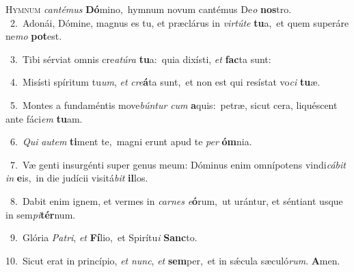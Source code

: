\lettrine{\initial\textcolor{\initialcolor}{H}}{ymnum} \textit{can}\-\textit{té}\textit{mus} \textbf{Dó}\-mino,~\star hymnum novum cantémus De\textit{o} \textbf{nos}\-tro.\\
{\numbfont\textcolor{\numbcolor}{~2.}}~Adonái, Dómine, magnus es tu, et præclárus in \textit{vir}\-\textit{tú}\textit{te} \textbf{tu}\-a,~\star et quem superáre ne\textit{mo} \textbf{pot}\-est.\par
{\numbfont\textcolor{\numbcolor}{~3.}}~Tibi sérviat omnis cre\-\textit{a}\-\textit{tú}\textit{ra} \textbf{tu}\-a:~\star quia dixísti, \textit{et} \textbf{fac}\-ta sunt:\par
{\numbfont\textcolor{\numbcolor}{~4.}}~Misísti spíritum tu\-\textit{um}\-, \textit{et} \textit{cre}\-\textbf{á}ta sunt,~\star et non est qui resístat vo\textit{ci} \textbf{tu}\-æ.\par
{\numbfont\textcolor{\numbcolor}{~5.}}~Montes a fundaméntis move\-\textit{bún}\-\textit{tur} \textit{cum} \textbf{a}\-quis:~\star petræ, sicut cera, liquéscent ante fáci\textit{em} \textbf{tu}\-am.\par
{\numbfont\textcolor{\numbcolor}{~6.}}~\textit{Qui} \textit{au}\-\textit{tem} \textbf{ti}\-ment te,~\star magni erunt apud te \textit{per} \textbf{óm}\-nia.\par
{\numbfont\textcolor{\numbcolor}{~7.}}~Væ genti insurgénti super genus meum: Dóminus enim omnípotens vindi\-\textit{cá}\-\textit{bit} \textit{in} \textbf{e}\-is,~\star in die judícii visitá\textit{bit} \textbf{il}\-los.\par
{\numbfont\textcolor{\numbcolor}{~8.}}~Dabit enim ignem, et vermes in \textit{car}\-\textit{nes} \textit{e}\-\textbf{ó}rum,~\star ut urántur, et séntiant usque in sem\-\textit{pi}\-\textbf{tér}num.\par
{\numbfont\textcolor{\numbcolor}{~9.}}~Glória \textit{Pa}\-\textit{tri}, \textit{et} \textbf{Fí}\-lio,~\star et Spirítu\textit{i} \textbf{Sanc}\-to.\par
{\numbfont\textcolor{\numbcolor}{10.}}~Sicut erat in princípio, \textit{et} \textit{nunc}\-, \textit{et} \textbf{sem}\-per,~\star et in sǽcula sæculó\-\textit{rum}\-. \textbf{A}\-men.\par
